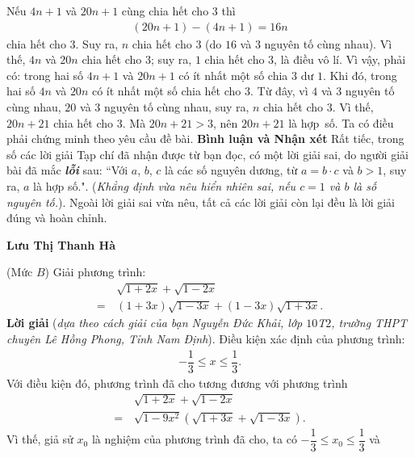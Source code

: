 \begin{multicols}{2}
	\vskip 0.1cm
	Nếu $4n + 1$ và $20n + 1$ cùng chia hết cho $3$ thì
	\begin{align*}
		(20n + 1) - (4n + 1) = 16n
	\end{align*}
	chia hết cho $3$. Suy ra, $n$ chia hết cho $3$ (do $16$ và $3$ nguyên tố cùng nhau). Vì thế, $4n$ và $20n$ chia hết cho $3$; suy ra, $1$ chia hết cho $3$, là điều vô lí. Vì vậy, phải có: trong hai số $4n + 1$ và $20n + 1$ có ít nhất một số chia $3$ dư $1$. Khi đó, trong hai số $4n$ và $20n$ có ít nhất một số chia hết cho $3$. Từ đây, vì $4$ và $3$ nguyên tố cùng nhau, $20$ và $3$ nguyên tố cùng nhau, suy ra, $n$ chia hết cho $3$. Vì thế, $20n + 21$ chia hết cho $3$. Mà $20n + 21 > 3$, nên $20n + 21$ là hợp~số.
	\vskip 0.05cm
	Ta có điều phải chứng minh theo yêu cầu đề bài.
	\vskip 0.05cm
	\textbf{Bình luận và Nhận xét}
	\vskip 0.05cm
	Rất tiếc, trong số các lời giải Tạp chí đã nhận được từ bạn đọc, có một lời giải sai, do người giải bài đã mắc \textbf{\textit{lỗi}} sau: ``Với $a$, $b$, $c$ là các số nguyên dương, từ  $a = b \cdot c$ và $b > 1$, suy ra, $a$ là hợp số.". (\textit{Khẳng định vừa nêu hiển nhiên sai, nếu $c = 1$ và $b$ là số nguyên tố.}). Ngoài lời giải sai vừa nêu, tất cả các lời giải còn lại đều là lời giải đúng và hoàn chỉnh.
	\begin{flushright}
		\textbf{Lưu Thị Thanh Hà}
	\end{flushright}
	{}
	(Mức $B$) Giải phương trình:
	\begin{align*}
		&\sqrt {1 + 2x}  + \sqrt {1 - 2x}  \\
		= \,&\left( {1 + 3x} \right)\sqrt {1 - 3x}  + \left( {1 - 3x} \right)\sqrt {1 + 3x} .
	\end{align*}
	\textbf{Lời giải} (\textit{dựa theo cách giải của bạn Nguyễn Đức Khải, lớp $10$T$2$, trường THPT chuyên Lê Hồng Phong, Tỉnh Nam Định}).
	\vskip 0.05cm
	Điều kiện xác định của phương trình:
	\begin{align*}
		-\dfrac{1}{3} \le x \le \dfrac{1}{3}.
	\end{align*}
	Với điều kiện đó, phương trình đã cho tương đương với phương trình
	\begin{align*}
		&\sqrt {1 + 2x}  + \sqrt {1 - 2x}  \\
		= \,&\sqrt {1 - 9{x^2}} \left( {\sqrt {1 + 3x}  + \sqrt {1 - 3x} } \right).
	\end{align*}
	Vì thế, giả sử $x_0$  là nghiệm của phương trình đã cho, ta có $ - \dfrac{1}{3} \le {x_0} \le \dfrac{1}{3}$  và
	\begin{align*}

\end{align*}
\end{multicols}
